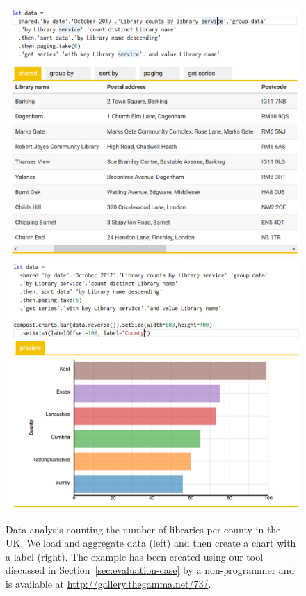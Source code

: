 \documentclass[english,crc]{programming}
\theoremstyle{plain}
\theoremstyle{definition}
\begin{document}

\begin{figure}[b]
\noindent
\hspace{-1em}
\includegraphics[scale=0.245]{figures/gallery1.png}
\includegraphics[scale=0.245]{figures/gallery2.png}
\caption{\small Data analysis counting the number of libraries per county in the UK. We load
  and aggregate data (left) and then create a chart with a label (right).
  The example has been created using our tool discussed in Section~\ref{sec:evaluation-case}
  by a non-programmer and is available at \url{http://gallery.thegamma.net/73/}.}
\label{fig:gallery}
\vspace{-1em}
\end{figure}
\end{document}
